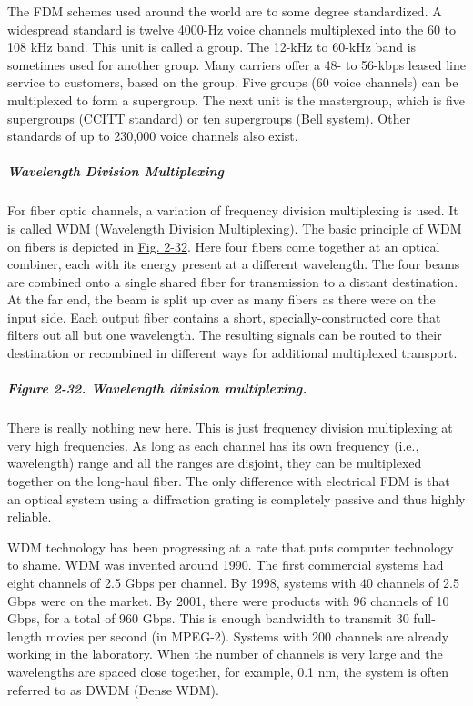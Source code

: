
The FDM schemes used around the world are to some degree standardized. A
widespread standard is twelve 4000-Hz voice channels multiplexed into
the 60 to 108 kHz band. This unit is called a {group.} The 12-kHz to
60-kHz band is sometimes used for another group. Many carriers offer a
48- to 56-kbps leased line service to customers, based on the group.
Five groups (60 voice channels) can be multiplexed to form a
{supergroup}. The next unit is the {mastergroup}, which is five
supergroups (CCITT standard) or ten supergroups (Bell system). Other
standards of up to 230,000 voice channels also exist.

\protect\hypertarget{0130661023_ch02lev1sec5.htmlux5cux23ch02lev3sec13}{}{}

\subparagraph{Wavelength Division Multiplexing}

For fiber optic channels, a variation of frequency division multiplexing
is used. It is called {WDM} ({Wavelength Division Multiplexing}). The
basic principle of WDM on fibers is depicted in
\protect\hyperlink{0130661023_ch02lev1sec5.htmlux5cux23ch02fig32}{Fig.
2-32}. Here four fibers come together at an optical combiner, each with
its energy present at a different wavelength. The four beams are
combined onto a single shared fiber for transmission to a distant
destination. At the far end, the beam is split up over as many fibers as
there were on the input side. Each output fiber contains a short,
specially-constructed core that filters out all but one wavelength. The
resulting signals can be routed to their destination or recombined in
different ways for additional multiplexed transport.

\subparagraph[Figure 2-32. Wavelength division
multiplexing.]{\texorpdfstring{\protect\hypertarget{0130661023_ch02lev1sec5.htmlux5cux23ch02fig32}{}{}Figure
2-32. Wavelength division
multiplexing.}{Figure 2-32. Wavelength division multiplexing.}}


There is really nothing new here. This is just frequency division
multiplexing at very high frequencies. As long as each channel has its
own frequency (i.e., wavelength) range and all the ranges are disjoint,
they can be multiplexed together on the long-haul fiber. The only
difference with electrical FDM is that an optical system using a
diffraction grating is completely passive and thus highly reliable.

WDM technology has been progressing at a rate that puts computer
technology to shame. WDM was invented around 1990. The first commercial
systems had eight channels of 2.5 Gbps per channel. By 1998, systems
with 40 channels of 2.5 Gbps were on the market. By 2001, there were
products with 96 channels of 10 Gbps, for a total of 960 Gbps. This is
enough bandwidth to transmit 30 full-length movies per second (in
MPEG-2). Systems with 200 channels are already working in the
laboratory. When the number of channels is very large and the
wavelengths are spaced close together, for example, 0.1 nm, the system
is often referred to as {DWDM} ({Dense WDM}).

